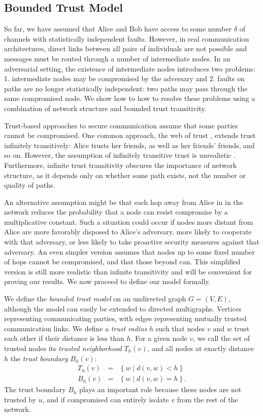 \documentclass[10pt,letterpaper]{article}
\newcommand{\beq}{\begin{eqnarray}}
\newcommand{\eeq}{\end{eqnarray}}
\begin{document}
\subsection*{Bounded Trust Model}

So far, we have assumed that Alice and Bob have access to some number
$\delta$ of channels with statistically independent faults.
However, in real communication architectures, direct links between all
pairs of individuals are not possible and messages must be routed through
a number of intermediate nodes.
In an adversarial setting,
the existence of intermediate nodes introduces two problems:
1. intermediate nodes may be compromised by the adversary and
2. faults on paths are no longer statistically independent:
two paths may pass through the same compromised node.
We show how to how to resolve these problems using a combination of network
structure and bounded trust transitivity.

Trust-based approaches to secure communication assume that some parties
cannot be compromised.
One common approach, the web of trust
\cite{zimmermann_official_1995,ferguson_practical_2003},
extends trust infinitely transitively:
Alice trusts her friends, as well as her friends' friends, and so on.
However, the assumption of infinitely transitive trust is unrealistic
\cite{christianson_why_1997}.
Furthermore, infinite trust transitivity obscures the importance of network structure,
as it depends only on whether some path exists, not the number or quality of paths.

An alternative assumption might be that each hop away from Alice in
in the network reduces the probability that a node can resist compromise
by a multiplicative constant.
Such a situation could occur if nodes more distant from Alice are
more favorably disposed to Alice's adversary, more likely to cooperate with that
adversary, or less likely to take proactive security measures against that
adversary.
An even simpler version assumes that nodes up to some
fixed number of hops cannot be compromised, and that those beyond can.
This simplified version is still more realistic than infinite transitivity
and will be convenient for proving our results.
We now proceed to define our model formally.

We define the {\em bounded trust model} on
an undirected graph $G = (V,E)$,
although the model can easily be extended to directed multigraphs.
Vertices representing communicating parties,
with edges representing mutually trusted communication links.
We define a {\em trust radius} $h$ such that nodes $v$ and
$w$ trust each other if their distance is less than $h$.
For a given node $v$,
we call the set of trusted nodes its
{\em trusted neighborhood} $T_h(v)$,
and all nodes at exactly distance $h$ the
{\em trust boundary} $B_h(v)$:
\beq
T_h(v) &=& \left\{ w \mid d(v,w) < h \right\} \\
B_h(v) &=& \left\{ w \mid d(v,w) = h \right\}.
\eeq
The trust boundary $B_h$ plays an important role because these nodes are not
trusted by $u$,
and if compromised can entirely isolate $v$ from the rest of the network.
\end{document}

